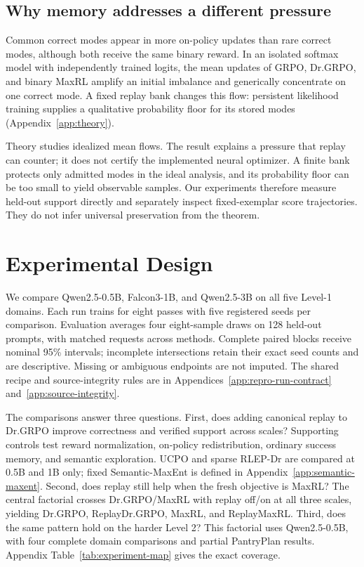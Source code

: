 \documentclass{article}
\newcommand{\1}{\mathbf 1}
\theoremstyle{remark}
\theoremstyle{definition}
\theoremstyle{plain}
\begin{document}
\subsection{Why memory addresses a different pressure}
\label{sec:collapse-mechanism}

Common correct modes appear in more on-policy updates than rare correct modes,
although both receive the same binary reward. In an isolated softmax model
with independently trained logits, the mean updates of GRPO, Dr.GRPO, and
binary MaxRL amplify an initial imbalance and generically concentrate on one
correct mode. A fixed replay bank changes this flow: persistent likelihood
training supplies a qualitative probability floor for its stored modes
(Appendix~\ref{app:theory}).

Theory studies idealized mean flows. The result explains a pressure that replay
can counter; it does not certify the implemented neural optimizer. A finite
bank protects only admitted modes in the ideal analysis, and its probability
floor can be too small to yield observable samples. Our experiments therefore
measure held-out support directly and separately inspect fixed-exemplar score
trajectories. They do not infer universal preservation from the theorem.

\section{Experimental Design}
\label{sec:experiments}
\label{sec:shared-protocol}

We compare Qwen2.5-0.5B, Falcon3-1B, and Qwen2.5-3B on all five Level-1 domains.
Each run trains for eight passes with five registered seeds per comparison.
Evaluation averages four eight-sample draws on 128 held-out prompts, with
matched requests across methods. Complete paired blocks receive nominal
95\% intervals; incomplete intersections retain their exact seed counts and
are descriptive. Missing or ambiguous endpoints are not imputed. The shared
recipe and source-integrity rules are in
Appendices~\ref{app:repro-run-contract} and~\ref{app:source-integrity}.

\label{sec:retention-design}
The comparisons answer three questions. First, does adding canonical replay
to Dr.GRPO improve correctness and verified support across scales? Supporting
controls test reward normalization, on-policy redistribution, ordinary success
memory, and semantic exploration. UCPO and sparse RLEP-Dr are compared at
0.5B and 1B only; fixed Semantic-MaxEnt is defined in
Appendix~\ref{app:semantic-maxent}. Second, does replay still help when the
fresh objective is MaxRL?
\label{sec:factorial-design}
The central factorial crosses Dr.GRPO/MaxRL with replay off/on at all three
scales, yielding Dr.GRPO, ReplayDr.GRPO, MaxRL, and ReplayMaxRL.
Third, does the same pattern hold on the harder Level 2? This factorial uses
Qwen2.5-0.5B, with four complete domain comparisons and partial PantryPlan
results. Appendix Table~\ref{tab:experiment-map} gives the exact coverage.
\end{document}
